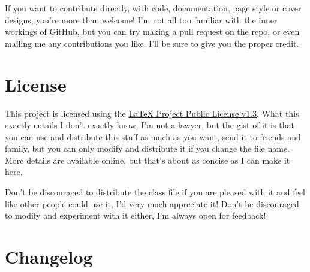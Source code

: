 \documentclass[palatino,english]{ist-report}
\begin{document}
If you want to contribute directly, with code, documentation, page style or cover designs, you're more than welcome! I'm not all too familiar with the inner workings of GitHub, but you can try making a pull request on the repo, or even mailing me any contributions you like. I'll be sure to give you the proper credit.

\section{License}

This project is licensed using the \href{https://www.latex-project.org/lppl/}{\LaTeX{} Project Public License v1.3}. What this exactly entails I don't exactly know, I'm not a lawyer, but the gist of it is that you can use and distribute this stuff as much as you want, send it to friends and family, but you can only modify and distribute it if you change the file name. More details are available online, but that's about as concise as I can make it here.

Don't be discouraged to distribute the class file if you are pleased with it and feel like other people could use it, I'd very much appreciate it! Don't be discouraged to modify and experiment with it either, I'm always open for feedback!

\section{Changelog}
\end{document}
